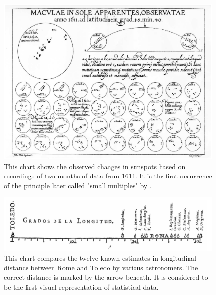 \begin{figure}[tp]
\centering
\includegraphics[keepaspectratio,width=\linewidth,height=\fullh / 3]{images/sunspot-changes.png}
\caption[Chart of Changes in Sunspots from 1626]{
  This chart shows the observed changes in sunspots based on recordings of two months of data from 1611.
  It is the first occurrence of the principle later called "small multiples" by \cite{VisualDisplayOfQuantitativeInformation}.
}
\label{fig:SunspotChanges}
\end{figure}

\begin{figure}[tp]
\centering
\includegraphics[keepaspectratio,width=\linewidth,height=\fullh / 3]{images/rome-toledo-longitude.png}
\caption[Chart of Longitudinal Distance Determinations Between Toledo and Rome From 1644]{
  This chart compares the twelve known estimates in longitudinal distance between Rome and Toledo by various astronomers.
  The correct distance is marked by the arrow beneath.
  It is considered to be the first visual representation of statistical data.
}
\label{fig:RomeToledoLongitude}
\end{figure}

